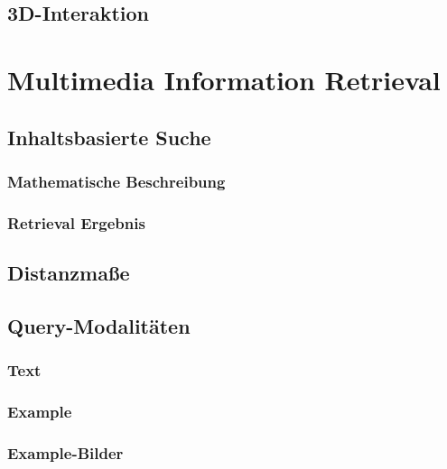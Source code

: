 \documentclass[a4paper, 11pt, accentcolor = tud3b]{tudreport}
\begin{document}
		\section{3D-Interaktion} %

	\chapter{Multimedia Information Retrieval} %

		\section{Inhaltsbasierte Suche} %

			\subsection{Mathematische Beschreibung} %

			\subsection{Retrieval Ergebnis} %

		\section{Distanzmaße} %

		\section{Query-Modalitäten} %

			\subsection{Text} %

			\subsection{Example} %

			\subsection{Example-Bilder} %
\end{document}
